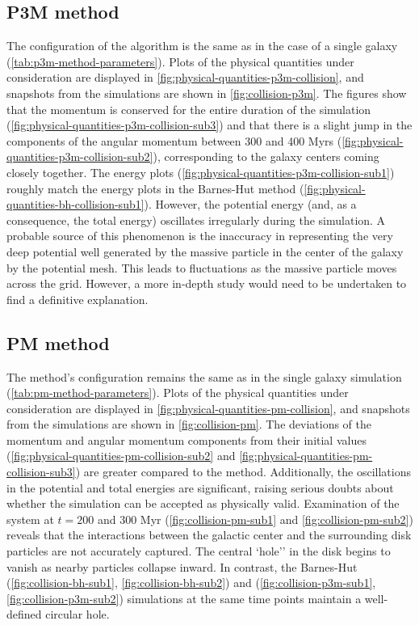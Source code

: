 \subsection{P3M method}
The configuration of the algorithm is the same as in the case of a single galaxy (\autoref{tab:p3m-method-parameters}).
Plots of the physical quantities under consideration are displayed in \autoref{fig:physical-quantities-p3m-collision}, and snapshots from the simulations are shown in \autoref{fig:collision-p3m}.
The figures show that the momentum is conserved for the entire duration of the simulation (\autoref{fig:physical-quantities-p3m-collision-sub3}) and that there is a slight jump in the components of the angular momentum between 300 and 400 Myrs (\autoref{fig:physical-quantities-p3m-collision-sub2}), corresponding to the galaxy centers coming closely together.
The energy plots (\autoref{fig:physical-quantities-p3m-collision-sub1}) roughly match the energy plots in the Barnes-Hut method (\autoref{fig:physical-quantities-bh-collision-sub1}).
However, the potential energy (and, as a consequence, the total energy) oscillates irregularly during the simulation.
A probable source of this phenomenon is the inaccuracy in representing the very deep potential well generated by the massive particle in the center of the galaxy by the potential mesh.
This leads to fluctuations as the massive particle moves across the grid.
However, a more in-depth study would need to be undertaken to find a definitive explanation.

\subsection{PM method}
The method's configuration remains the same as in the single galaxy simulation (\autoref{tab:pm-method-parameters}).
Plots of the physical quantities under consideration are displayed in \autoref{fig:physical-quantities-pm-collision}, and snapshots from the simulations are shown in \autoref{fig:collision-pm}.
The deviations of the momentum and angular momentum components from their initial values (\autoref{fig:physical-quantities-pm-collision-sub2} and \autoref{fig:physical-quantities-pm-collision-sub3}) are greater compared to the \PThreeM{} method.
Additionally, the oscillations in the potential and total energies are significant, raising serious doubts about whether the simulation can be accepted as physically valid.
Examination of the system at $t = 200$ and $300$ Myr (\autoref{fig:collision-pm-sub1} and \autoref{fig:collision-pm-sub2}) reveals that the interactions between the galactic center and the surrounding disk particles are not accurately captured.
The central `hole'' in the disk begins to vanish as nearby particles collapse inward.
In contrast, the Barnes-Hut (\autoref{fig:collision-bh-sub1}, \autoref{fig:collision-bh-sub2}) and \PThreeM{} (\autoref{fig:collision-p3m-sub1}, \autoref{fig:collision-p3m-sub2}) simulations at the same time points maintain a well-defined circular hole.